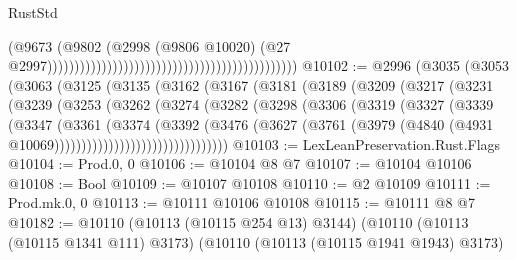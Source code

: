 \begin{lexlean}{RustStd}
\begin{coremodule}
                                                                                        (@9673
                                                                                          (@9802
                                                                                            (@2998
                                                                                              (@9806
                                                                                                @10020)
                                                                                              (@27
                                                                                                @2997))))))))))))))))))))))))))))))))))))))))))))))
@10102 := @2996
    (@3035
      (@3053
        (@3063
          (@3125
            (@3135
              (@3162
                (@3167
                  (@3181
                    (@3189
                      (@3209
                        (@3217
                          (@3231
                            (@3239
                              (@3253
                                (@3262
                                  (@3274
                                    (@3282
                                      (@3298
                                        (@3306
                                          (@3319
                                            (@3327
                                              (@3339
                                                (@3347
                                                  (@3361
                                                    (@3374
                                                      (@3392
                                                        (@3476
                                                          (@3627
                                                            (@3761
                                                              (@3979
                                                                (@4840
                                                                  (@4931
                                                                    @10069))))))))))))))))))))))))))))))))
@10103 := LexLeanPreservation.Rust.Flags
@10104 := Prod.{0, 0}
@10106 := @10104 @8 @7
@10107 := @10104 @10106
@10108 := Bool
@10109 := @10107 @10108
@10110 := @2 @10109
@10111 := Prod.mk.{0, 0}
@10113 := @10111 @10106 @10108
@10115 := @10111 @8 @7
@10182 := @10110
    (@10113 (@10115 @254 @13) @3144)
    (@10110
      (@10113 (@10115 @1341 @111) @3173)
      (@10110
        (@10113 (@10115 @1941 @1943) @3173)

\end{coremodule}
\end{lexlean}
